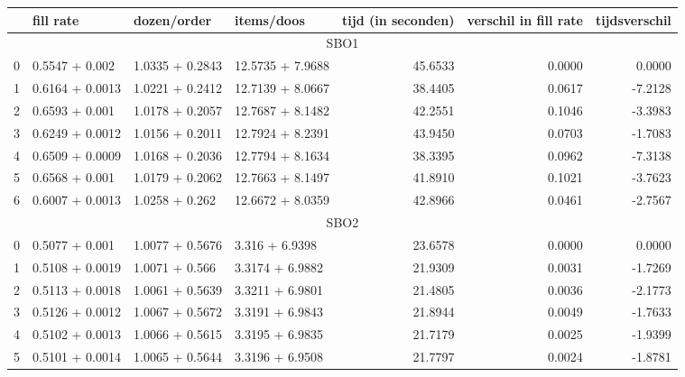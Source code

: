 \begin{tabular}{llllrrr}
  \toprule
  {} &        fill rate &      dozen/order &       items/doos &  tijd (in seconden) &  verschil in fill rate &  tijdsverschil \\
  \midrule
  \multicolumn{7}{c}{SBO1} \\
  \midrule
  0 &   0.5547 + 0.002 &  1.0335 + 0.2843 &  12.5735 + 7.9688 &             45.6533 &                 0.0000 &         0.0000 \\
  1 &  0.6164 + 0.0013 &  1.0221 + 0.2412 &  12.7139 + 8.0667 &             38.4405 &                 0.0617 &        -7.2128 \\
  2 &   0.6593 + 0.001 &  1.0178 + 0.2057 &  12.7687 + 8.1482 &             42.2551 &                 0.1046 &        -3.3983 \\
  3 &  0.6249 + 0.0012 &  1.0156 + 0.2011 &  12.7924 + 8.2391 &             43.9450 &                 0.0703 &        -1.7083 \\
  4 &  0.6509 + 0.0009 &  1.0168 + 0.2036 &  12.7794 + 8.1634 &             38.3395 &                 0.0962 &        -7.3138 \\
  5 &   0.6568 + 0.001 &  1.0179 + 0.2062 &  12.7663 + 8.1497 &             41.8910 &                 0.1021 &        -3.7623 \\
  6 &  0.6007 + 0.0013 &   1.0258 + 0.262 &  12.6672 + 8.0359 &             42.8966 &                 0.0461 &        -2.7567 \\
  \midrule
  \multicolumn{7}{c}{SBO2} \\
  \midrule
  0 &   0.5077 + 0.001 &  1.0077 + 0.5676 &   3.316 + 6.9398 &             23.6578 &                 0.0000 &         0.0000 \\
  1 &  0.5108 + 0.0019 &   1.0071 + 0.566 &  3.3174 + 6.9882 &             21.9309 &                 0.0031 &        -1.7269 \\
  2 &  0.5113 + 0.0018 &  1.0061 + 0.5639 &  3.3211 + 6.9801 &             21.4805 &                 0.0036 &        -2.1773 \\
  3 &  0.5126 + 0.0012 &  1.0067 + 0.5672 &  3.3191 + 6.9843 &             21.8944 &                 0.0049 &        -1.7633 \\
  4 &  0.5102 + 0.0013 &  1.0066 + 0.5615 &  3.3195 + 6.9835 &             21.7179 &                 0.0025 &        -1.9399 \\
  5 &  0.5101 + 0.0014 &  1.0065 + 0.5644 &  3.3196 + 6.9508 &             21.7797 &                 0.0024 &        -1.8781 \\

\end{tabular}
